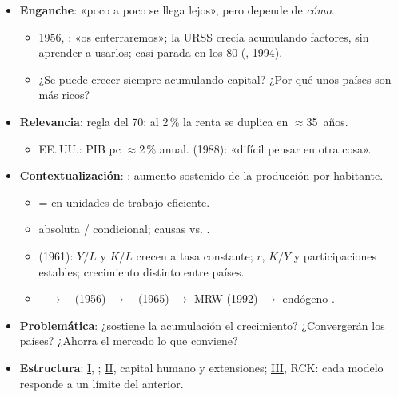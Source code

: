\documentclass{article}
\begin{document}
\cabecerarepaso
\begin{columnas}

\begin{itemize}
\item \textbf{Enganche}: «poco a poco se llega lejos», pero depende de \emph{cómo}.
  \begin{itemize}
  \item 1956, : «os enterraremos»; la URSS crecía acumulando factores, sin aprender a usarlos; casi parada en los 80 (, 1994).
  \item ¿Se puede crecer siempre acumulando capital? ¿Por qué unos países son más ricos?
  \end{itemize}
\item \textbf{Relevancia}: regla del 70: al 2\,\% la renta se duplica en $\approx$35~años.
  \begin{itemize}
  \item EE.\,UU.: PIB pc $\approx$2\,\% anual.  (1988): «difícil pensar en otra cosa».
  \end{itemize}
\item \textbf{Contextualización}: : aumento sostenido de la producción por habitante.
  \begin{itemize}
  \item {} =  en unidades de trabajo eficiente.
  \item {} absoluta / condicional; causas  vs. .
  \item {} (1961): $Y/L$ y $K/L$ crecen a tasa constante; $r$, $K/Y$ y participaciones estables; crecimiento distinto entre países.
  \item {}- $\to$ - (1956) $\to$ - (1965) $\to$ MRW (1992) $\to$ endógeno .
  \end{itemize}
\item \textbf{Problemática}: ¿sostiene la acumulación el crecimiento? ¿Convergerán los países? ¿Ahorra el mercado lo que conviene?
\item \textbf{Estructura}: \hyperref[rep:I]{I}, ; \hyperref[rep:II]{II}, capital humano y extensiones; \hyperref[rep:III]{III}, RCK: cada modelo responde a un límite del anterior.
\end{itemize}


\end{columnas}
\end{document}
